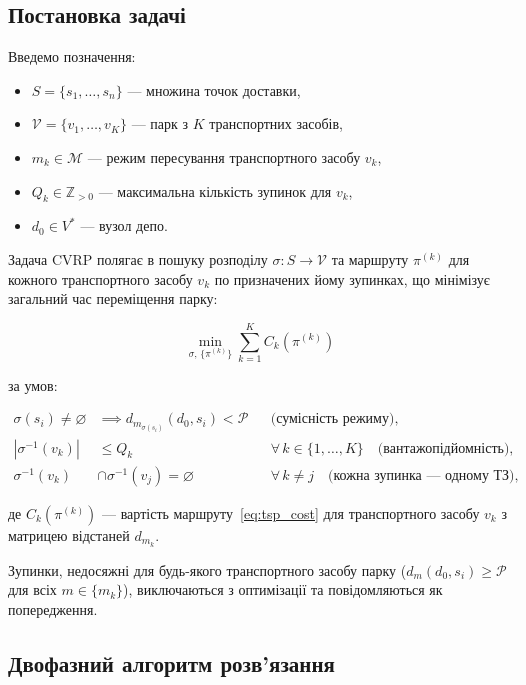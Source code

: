 \documentclass[12pt, a4paper]{article}
\theoremstyle{definition}
\begin{document}
\subsection{Постановка задачі}

Введемо позначення:
\begin{itemize}
  \item $S = \{s_1, \ldots, s_n\}$ --- множина точок доставки,
  \item $\mathcal{V} = \{v_1, \ldots, v_K\}$ --- парк з $K$ транспортних засобів,
  \item $m_k \in \mathcal{M}$ --- режим пересування транспортного засобу $v_k$,
  \item $Q_k \in \mathbb{Z}_{>0}$ --- максимальна кількість зупинок для $v_k$,
  \item $d_0 \in V^*$ --- вузол депо.
\end{itemize}

Задача CVRP полягає в пошуку розподілу $\sigma : S \to \mathcal{V}$ та
маршруту $\pi^{(k)}$ для кожного транспортного засобу $v_k$ по призначених
йому зупинках, що мінімізує загальний час переміщення парку:

\begin{equation}
  \label{eq:cvrp}
  \min_{\sigma,\, \{\pi^{(k)}\}} \sum_{k=1}^{K} C_k\!\left(\pi^{(k)}\right)
\end{equation}

\noindent за умов:

\begin{align}
  \sigma(s_i) \neq \varnothing
    &\implies d_{m_{\sigma(s_i)}}(d_0, s_i) < \mathcal{P}
    & &\text{(сумісність режиму)}, \label{eq:cvrp_mode}\\
  \left|\sigma^{-1}(v_k)\right| &\leq Q_k
    & &\forall\, k \in \{1,\ldots,K\}\quad\text{(вантажопідйомність)},\label{eq:cvrp_cap}\\
  \sigma^{-1}(v_k) &\cap \sigma^{-1}(v_j) = \varnothing
    & &\forall\, k \neq j\quad\text{(кожна зупинка --- одному ТЗ)}, \label{eq:cvrp_part}
\end{align}

\noindent де $C_k(\pi^{(k)})$ --- вартість маршруту~\eqref{eq:tsp_cost} для
транспортного засобу $v_k$ з матрицею відстаней $d_{m_k}$.

Зупинки, недосяжні для будь-якого транспортного засобу парку
($d_m(d_0, s_i) \geq \mathcal{P}$ для всіх $m \in \{m_k\}$), виключаються
з оптимізації та повідомляються як попередження.

\subsection{Двофазний алгоритм розв'язання}
\end{document}
